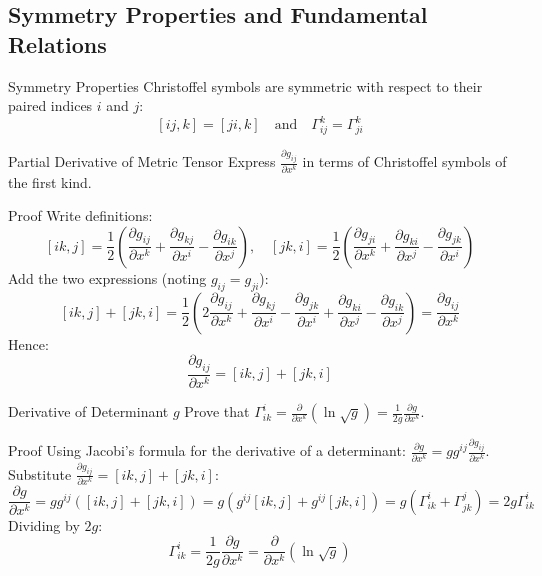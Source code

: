 \documentclass[11pt,a4paper]{article}
\begin{document}
\subsection{Symmetry Properties and Fundamental Relations}
\begin{importantbox}{Symmetry Properties}
Christoffel symbols are symmetric with respect to their paired indices $i$ and $j$:
\[
[ij, k] = [ji, k] \quad \text{and} \quad \Gamma^k_{ij} = \Gamma^k_{ji}
\]
\end{importantbox}

\begin{theorembox}{Partial Derivative of Metric Tensor}
Express $\frac{\partial g_{ij}}{\partial x^k}$ in terms of Christoffel symbols of the first kind.
\end{theorembox}
\begin{proofbox}{Proof}
Write definitions:
\[
[ik, j] = \frac{1}{2} \left( \frac{\partial g_{ij}}{\partial x^k} + \frac{\partial g_{kj}}{\partial x^i} - \frac{\partial g_{ik}}{\partial x^j} \right), \quad [jk, i] = \frac{1}{2} \left( \frac{\partial g_{ji}}{\partial x^k} + \frac{\partial g_{ki}}{\partial x^j} - \frac{\partial g_{jk}}{\partial x^i} \right)
\]
Add the two expressions (noting $g_{ij} = g_{ji}$):
\[
[ik, j] + [jk, i] = \frac{1}{2} \left( 2 \frac{\partial g_{ij}}{\partial x^k} + \frac{\partial g_{kj}}{\partial x^i} - \frac{\partial g_{jk}}{\partial x^i} + \frac{\partial g_{ki}}{\partial x^j} - \frac{\partial g_{ik}}{\partial x^j} \right) = \frac{\partial g_{ij}}{\partial x^k}
\]
Hence:
\[
\frac{\partial g_{ij}}{\partial x^k} = [ik, j] + [jk, i]
\]
\end{proofbox}

\begin{theorembox}{Derivative of Determinant $g$}
Prove that $\Gamma^i_{ik} = \frac{\partial}{\partial x^k} \left( \ln \sqrt{g} \right) = \frac{1}{2g} \frac{\partial g}{\partial x^k}$.
\end{theorembox}
\begin{proofbox}{Proof}
Using Jacobi's formula for the derivative of a determinant: $\frac{\partial g}{\partial x^k} = g g^{ij} \frac{\partial g_{ij}}{\partial x^k}$. \\
Substitute $\frac{\partial g_{ij}}{\partial x^k} = [ik, j] + [jk, i]$:
\[
\frac{\partial g}{\partial x^k} = g g^{ij} \left( [ik, j] + [jk, i] \right) = g \left( g^{ij} [ik, j] + g^{ij} [jk, i] \right) = g \left( \Gamma^i_{ik} + \Gamma^j_{jk} \right) = 2 g \Gamma^i_{ik}
\]
Dividing by $2g$:
\[
\Gamma^i_{ik} = \frac{1}{2g} \frac{\partial g}{\partial x^k} = \frac{\partial}{\partial x^k} \left( \ln \sqrt{g} \right)
\]
\end{proofbox}
\end{document}

